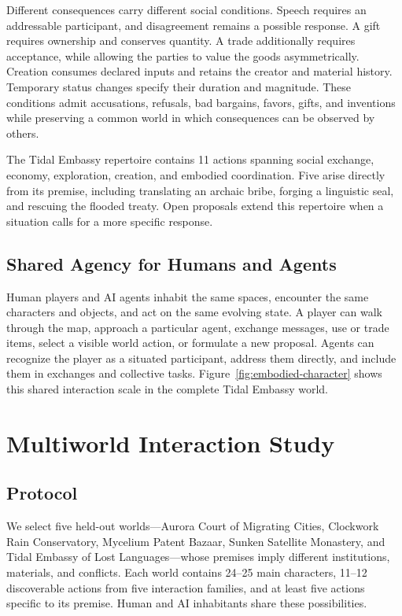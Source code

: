 \documentclass[10pt,twocolumn]{article}
\begin{document}
Different consequences carry different social conditions. Speech requires an
addressable participant, and disagreement remains a possible response. A gift
requires ownership and conserves quantity. A trade additionally requires
acceptance, while allowing the parties to value the goods asymmetrically.
Creation consumes declared inputs and retains the creator and material history.
Temporary status changes specify their duration and magnitude. These conditions
admit accusations, refusals, bad bargains, favors, gifts, and inventions while
preserving a common world in which consequences can be observed by others.

The Tidal Embassy repertoire contains 11 actions spanning social exchange,
economy, exploration, creation, and embodied coordination. Five arise directly
from its premise, including translating an archaic bribe, forging a linguistic
seal, and rescuing the flooded treaty. Open proposals extend this repertoire
when a situation calls for a more specific response.

\subsection{Shared Agency for Humans and Agents}

Human players and AI agents inhabit the same spaces, encounter the same
characters and objects, and act on the same evolving state. A player can walk
through the map, approach a particular agent, exchange messages, use or trade
items, select a visible world action, or formulate a new proposal. Agents can
recognize the player as a situated participant, address them directly, and
include them in exchanges and collective tasks. Figure~\ref{fig:embodied-character}
shows this shared interaction scale in the complete Tidal Embassy world.

\section{Multiworld Interaction Study}

\subsection{Protocol}

We select five held-out worlds---Aurora Court of Migrating Cities, Clockwork
Rain Conservatory, Mycelium Patent Bazaar, Sunken Satellite Monastery, and
Tidal Embassy of Lost Languages---whose premises imply different institutions,
materials, and conflicts. Each world contains 24--25 main characters, 11--12
discoverable actions from five interaction families, and at least five actions
specific to its premise. Human and AI inhabitants share these possibilities.
\end{document}
